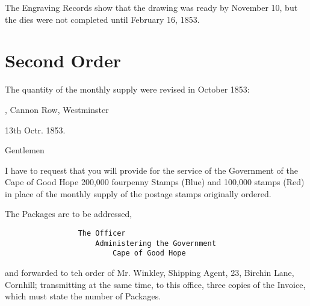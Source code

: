 The Engraving Records show that the drawing was ready by November 10, but the dies were not completed until February 16, 1853.


\section{Second Order}

The quantity of the monthly supply were revised in October 1853:

{, Cannon Row, Westminster

13th Octr. 1853.

Gentlemen

I have to request that you will provide for the service of the Government of the Cape of Good Hope 200,000 fourpenny Stamps (Blue) and 100,000 stamps (Red) in place of the monthly supply of the postage stamps originally ordered.

The Packages are to be addressed,
\begin{verbatim}
                 The Officer
                     Administering the Government
                         Cape of Good Hope
\end{verbatim}
and forwarded to teh order of Mr. Winkley, Shipping Agent, 23, Birchin Lane, Cornhill; transmitting at the same time, to this office, three copies of the Invoice, which must state the number of Packages.
}




















                                                 